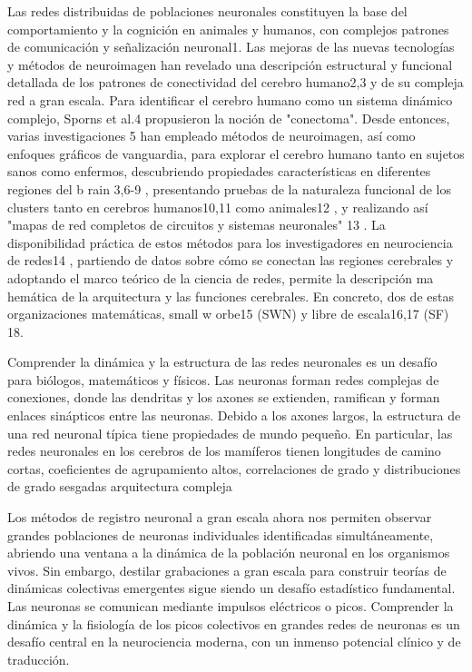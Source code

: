 Las redes distribuidas de poblaciones neuronales constituyen la base del comportamiento y la cognición en animales y humanos, con complejos patrones de comunicación y señalización neuronal1. Las mejoras de las nuevas tecnologías y métodos de neuroimagen han revelado una descripción estructural y funcional detallada de los patrones de conectividad del cerebro humano2,3 y de su compleja red a gran escala. Para identificar el cerebro humano como un sistema dinámico complejo, Sporns et al.4 propusieron la noción de "conectoma". Desde entonces, varias investigaciones 5 han empleado métodos de neuroimagen, así como enfoques gráficos de vanguardia, para explorar el cerebro humano tanto en sujetos sanos como enfermos, descubriendo propiedades características en diferentes regiones del b rain 3,6-9 , presentando pruebas de la naturaleza funcional de los clusters tanto en cerebros humanos10,11 como animales12 , y realizando así "mapas de red completos de circuitos y sistemas neuronales" 13 . La disponibilidad práctica de estos métodos para los investigadores en neurociencia de redes14 , partiendo de datos sobre cómo se conectan las regiones cerebrales y adoptando el marco teórico de la ciencia de redes, permite la descripción ma hemática de la arquitectura y las funciones cerebrales. En concreto, dos de estas organizaciones matemáticas, small w orbe15 (SWN) y libre de escala16,17 (SF) 18.





Comprender la dinámica y la estructura de las redes neuronales es un desafío para biólogos, matemáticos y físicos. Las neuronas forman redes complejas de conexiones, donde las dendritas y los axones se extienden, ramifican y forman enlaces sinápticos entre las neuronas. Debido a los axones largos, la estructura de una red neuronal típica tiene propiedades de mundo pequeño. En particular, las redes neuronales en los cerebros de los mamíferos tienen longitudes de camino cortas, coeficientes de agrupamiento altos, correlaciones de grado y distribuciones de grado sesgadas  arquitectura compleja


Los métodos de registro neuronal a gran escala ahora nos permiten observar grandes poblaciones de neuronas individuales identificadas simultáneamente, abriendo una ventana a la dinámica de la población neuronal en los organismos vivos. Sin embargo, destilar grabaciones a gran escala para construir teorías de dinámicas colectivas emergentes sigue siendo un desafío estadístico fundamental.
Las neuronas se comunican mediante impulsos eléctricos o picos. Comprender la dinámica y la fisiología de los picos colectivos en grandes redes de neuronas es un desafío central en la neurociencia moderna, con un inmenso potencial clínico y de traducción.

